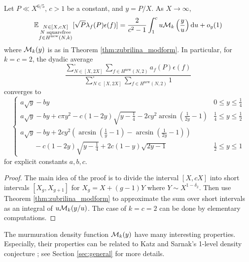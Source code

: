 \begin{theorem}
    \label{thm:zubrilina_geom}
    Let $P \ll X^{6/5}$, $c > 1$ be a constant, and $y = P / X$. As $X \to \infty$,
    \begin{equation}
        \mathbb{E}_{\substack{N \in [X, cX] \\ N \text{ squarefree} \\ f \in H^{\text{new}}(N, k)}} [\sqrt{P} \lambda_f(P) \epsilon(f)] = \frac{2}{c^2 - 1} \int_1^c u \mathcal{M}_{k}\left(\frac{y}{u} \right) \mathrm{d} u + o_y(1)
    \end{equation}
    where $\mathcal{M}_k(y)$ is as in Theorem \ref{thm:zubrilina_modform}.
    In particular, for $k = c = 2$, the dyadic average
    \begin{equation}
        \frac{\sum_{N \in [X, 2X]}^{\square} \sum_{f \in H^{\text{new}}(N, 2)} a_f(P) \epsilon(f)}{\sum_{N \in [X, 2X]}^{\square} \sum_{f \in H^{\text{new}}(N, 2)} 1}
    \end{equation}
    converges to
    \begin{equation}
        \begin{cases}
            a \sqrt{y} - b y & 0 \le y \le \frac{1}{4} \\
            a\sqrt{y} - by + c \pi y^2 - c (1 - 2y) \sqrt{y - \frac{1}{4}} - 2 c y^2 \arcsin\left(\frac{1}{2y} - 1\right)& \frac{1}{4} \le y \le \frac{1}{2} \\
            a \sqrt{y} - by + 2cy^2 \left(\arcsin\left(\frac{1}{y} - 1\right) - \arcsin\left(\frac{1}{2y} - 1 \right)\right) & \\
            \quad\quad -c(1 - 2y) \sqrt{y - \frac{1}{4}} + 2c (1 - y) \sqrt{2y - 1} & \frac{1}{2} \le y \le 1
        \end{cases}
    \end{equation}
    for explicit constants $a, b, c$.
\end{theorem}
\begin{proof}
    The main idea of the proof is to divide the interval $[X, cX]$ into short intervals $[X_g, X_{g+1}]$ for $X_g = X + (g - 1)Y$ where $Y \sim X^{1 - \delta_2}$.
    Then use Theorem \ref{thm:zubrilina_modform} to approximate the sum over short intervals as an integral of $u \mathcal{M}_k(y/u)$.
    The case of $k = c = 2$ can be done by elementary computations.
\end{proof}

The murmuration density function $\mathcal{M}_k(y)$ have many interesting properties.
Especially, their properties can be related to Katz and Sarnak's 1-level density conjecture \cite{katz1999zeroes}; see Section \ref{sec:general} for more details.

